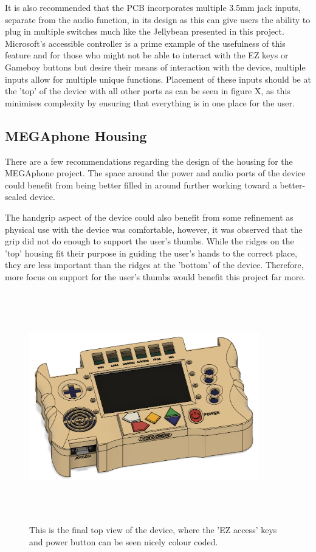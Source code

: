 It is also recommended that the PCB incorporates multiple 3.5mm jack inputs, separate from the audio function, in its design as this can give users the ability to plug in multiple switches much like the Jellybean presented in this project.
Microsoft's accessible controller \cite{adaptive} is a prime example of the usefulness of this feature and for those who might not be able to interact with the EZ keys or Gameboy buttons but desire their means of interaction with the device, multiple inputs allow for multiple unique functions.
Placement of these inputs should be at the 'top' of the device with all other ports as can be seen in figure X, as this minimises complexity by ensuring that everything is in one place for the user.

\subsection{MEGAphone Housing} \label{FutureHousing}

There are a few recommendations regarding the design of the housing for the MEGAphone project.
The space around the power and audio ports of the device could benefit from being better filled in around further working toward a better-sealed device.

The handgrip aspect of the device could also benefit from some refinement as physical use with the device was comfortable, however, it was observed that the grip did not do enough to support the user's thumbs.
While the ridges on the 'top' housing fit their purpose in guiding the user's hands to the correct place, they are less important than the ridges at the 'bottom' of the device.
Therefore, more focus on support for the user's thumbs would benefit this project far more.

\begin{figure} [h]
    \centering
    \includegraphics[width=10cm,height=10cm,keepaspectratio]{Figures/final_front_cad.png}
    \caption{This is the final top view of the device, where the 'EZ access' keys and power button can be seen nicely colour coded.}
    \label{fig:FinalTOP}
\end{figure}

